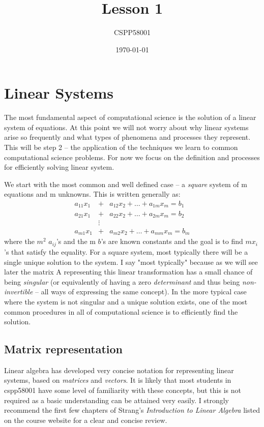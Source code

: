 \documentclass[11pt]{article}
\begin{document}
\title{Lesson 1} 
\author{CSPP58001}
\date{\today}
\maketitle

\section{Linear Systems}
The most fundamental aspect of computational science is the solution of
a linear system of equations. At this point we will not worry about why
linear systems arise so frequently and what types of phenomena and processes
they represent. This will be step 2 -- the application of the techniques we learn
to common computational science problems. For now we focus on the definition
and processes for efficiently solving linear system.

We start with the most common and well
defined case -- a {\em square} system of m equations and m unknowns.
This is written generally as:
\begin{eqnarray}
a_{11} x_1 &+& a_{12} x_2 + \ldots + a_{1m}x_m = b_1 \nonumber \\ 
a_{21} x_1 &+& a_{22} x_2 + \ldots + a_{2m}x_m = b_2 \nonumber \\
&\vdots& \nonumber \\ 
a_{m1} x_1 &+& a_{m2} x_2 + \ldots + a_{mm}x_m = b_m \nonumber
\end{eqnarray}
where the $m^2$ $a_{ij}$'s and the m $b$'s are known constants and the goal
is to find  $m x_i$'s that satisfy the equality. For a square system, most typically there will be a single unique
solution to the system. I say "most typically" because as we will see later the
matrix A representing this linear transformation has a small chance of being {\em singular}
(or equivalently of having a zero {\em determinant} and thus being {\em non-invertible} --
all ways of expressing the same concept). In the more typical case where the system
is not singular and a unique solution exists, one of the most common procedures in all of 
computational science is to efficiently find the solution. 

\subsection{Matrix representation}
Linear algebra has developed very concise notation for representing linear systems,
based on {\em matrices} and {\em vectors}. It is likely that most students in cspp58001
have some level of familiarity with these concepts, but this is not required as a basic understanding 
can be attained very easily. I strongly recommend the first few chapters of Strang's {\em Introduction
to Linear Algebra} listed on the course website for a clear and concise review.
\end{document}
